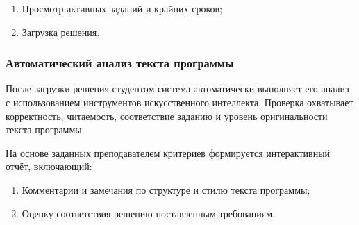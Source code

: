 \begin{enumerate}
  \item Просмотр активных заданий и крайних сроков;
  \item Загрузка решения.
\end{enumerate}

\subsubsection{Автоматический анализ текста программы}
После загрузки решения студентом система автоматически выполняет его анализ с использованием инструментов искусственного интеллекта. Проверка охватывает корректность, читаемость, соответствие заданию и уровень оригинальности текста программы.

На основе заданных преподавателем критериев формируется интерактивный отчёт, включающий:
\begin{enumerate}
  \item Комментарии и замечания по структуре и стилю текста программы;
  \item Оценку соответствия решению поставленным требованиям.
\end{enumerate}
